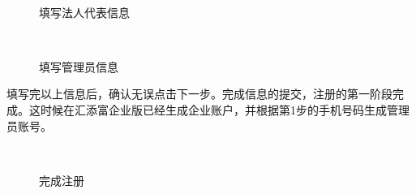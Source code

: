 \\
\begin{figure}[htbp!]
  \centering
  \caption{填写法人代表信息}
\end{figure}

\\
\begin{figure}[htbp!]
  \centering
  \caption{填写管理员信息}
\end{figure}

填写完以上信息后，确认无误点击下一步。完成信息的提交，注册的第一阶段完成。这时候在汇添富企业版已经生成企业账户，并根据第1步的手机号码生成管理员账号。\par

\\
\begin{figure}[htbp!]
  \centering
  \caption{完成注册}
\end{figure}

